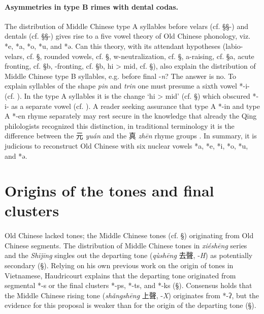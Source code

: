 \paragraph{Asymmetries in type B rimes with
dental codas.} 
\label{par:Asymmetries-in-type-B-rimes-with-dental-codas}
The distribution of Middle Chinese type A syllables
before velars (cf. §§-) and dentals (cf. §§-) gives rise to a five vowel
theory of Old Chinese phonology, viz. *e, *a, *o, *u, and *ə. Can this
theory, with its attendant hypotheses (labio-velars, cf. §, rounded
vowels, cf. §, w-neutralization, cf. §, a-raising, cf. §a, acute
fronting, cf. §b, {}-fronting, cf. §b, hi \textgreater{} mid, cf. §),
also explain the distribution of Middle Chinese type B syllables, e.g.
before final -\emph{n}? The answer is no. To explain syllables of the
shape \emph{pin} and \emph{trin} one must presume a sixth vowel *-i-
(cf. ). In the type A syllables it is the change `hi \textgreater{} mid'
(cf. §) which obscured *-i- as a separate vowel (cf. ). A reader seeking
assurance that type A *-in and type A *-en rhyme separately may rest
secure in the knowledge that already the Qīng philologists recognized
this distinction, in traditional terminology it is the difference
between the 元 \emph{yuán} and the 真  \emph{zhēn} rhyme groups 
\citep[203]{Baxter2014OldChinese}. In summary, it is judicious to reconstruct Old
Chinese with six nuclear vowels *a, *e, *i, *o, *u, and *ə.

\section{Origins of the tones and final
clusters}

\paragraph{} 
\label{origins-of-the-tones-and-final-clusters}
Old Chinese lacked tones; the
Middle Chinese tones (cf. §) originating from Old Chinese segments. The
distribution of Middle Chinese tones in  \emph{xiéshēng} series and the
 \emph{Shījīng} singles out the departing tone (\emph{qùshēng} 去聲,
-\emph{H}) as potentially secondary (§). Relying on his own pre­vious
work on the origin of tones in Vietnamese, Haudricourt explains that the
departing tone originated from segmental *-s or the final clusters *-ps,
*-ts, and *-ks (§). Consensus holds that the Middle Chinese rising tone
(\emph{shǎngshēng} 上聲, -\emph{X}) originates from *-ʔ, but the
evidence for this proposal is weaker than for the origin of the
departing tone (§).


